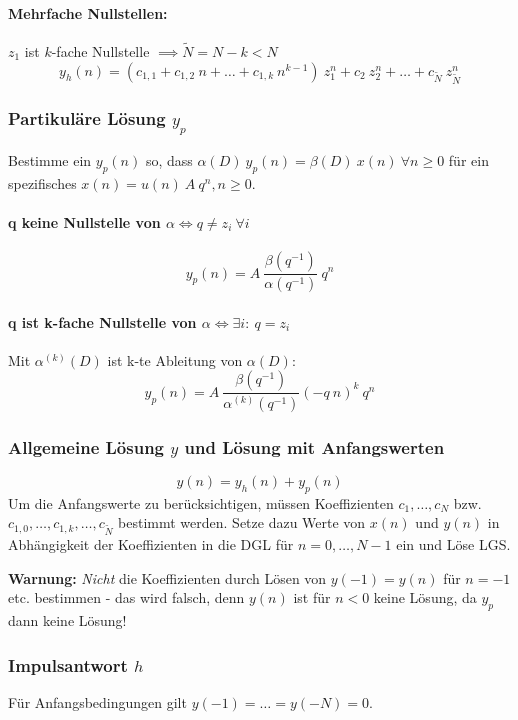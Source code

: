 \documentclass[10pt,a4paper]{article}
\begin{document}
\paragraph{Mehrfache Nullstellen:} $z_1$ ist $k$-fache Nullstelle $\implies \tilde N = N - k < N$
\[
	y_h(n) = \left(c_{1,1} + c_{1,2} ~ n + … + c_{1,k} ~ n^{k-1}\right) ~ z_1^n + c_2 ~ z_2^n + … + c_{\tilde N} ~ z_{\tilde N}^n
\]

\subsubsection*{Partikuläre Lösung $y_p$}
Bestimme ein $y_p(n)$ so, dass $\alpha(D) ~ y_p(n) = \beta(D) ~ x(n) ~ \forall n \geq 0$ für ein spezifisches $x(n) = u(n) ~ A ~ q^n, n \geq 0$.

\paragraph{q keine Nullstelle von $\alpha \Leftrightarrow q \neq z_i ~ \forall i$}
\[
	y_p(n) = A ~ \frac{\beta(q^{-1})}{\alpha(q^{-1})} ~ q^n
\]
\paragraph{q ist k-fache Nullstelle von $\alpha \Leftrightarrow \exists i: ~ q = z_i$} Mit $\alpha^{(k)}(D)$ ist k-te Ableitung von $\alpha(D)$:
\[
	y_p(n) = A ~ \frac{\beta(q^{-1})}{\alpha^{(k)}(q^{-1})} (-q ~ n)^k ~ q^n
\]

\subsubsection*{Allgemeine Lösung $y$ und Lösung mit Anfangswerten}
\[
	y(n) = y_h(n) + y_p(n)
\]
Um die Anfangswerte zu berücksichtigen, müssen Koeffizienten $c_1, …, c_N$ bzw. $c_{1,0}, …, c_{1,k}, …, c_{\tilde N}$ bestimmt werden. Setze dazu Werte von $x(n)$ und $y(n)$ in Abhängigkeit der Koeffizienten in die DGL für $n = 0, …, N - 1$ ein und Löse LGS.

\vspace{.5em}
\raggedright
\textbf{Warnung:} \textit{Nicht} die Koeffizienten durch Lösen von $y(-1) = y(n)$ für $n = -1$ etc. bestimmen - das wird falsch, denn $y(n)$ ist für $n < 0$ keine Lösung, da $y_p$ dann keine Lösung!

\subsubsection*{Impulsantwort $h$}
Für Anfangsbedingungen gilt $y(-1) = … = y(-N) = 0$.
\end{document}
